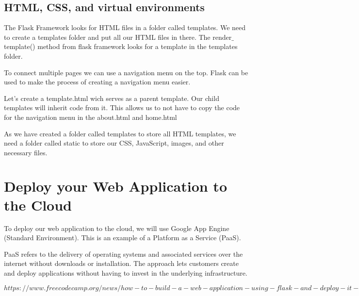 \documentclass{article}
\begin{document}

\subsection{HTML, CSS, and virtual environments}

The Flask Framework looks for HTML files in a folder called templates. We need to create a templates folder and put all our HTML files in there. The render$\_$template() method from flask framework looks for a template in the templates folder.

To connect multiple pages we can use a navigation menu on the top. Flask can be used to make the process of creating a navigation menu easier.

Let's create a template.html wich serves as a parent template. Our child templates will inherit code from it. This allows us to not have to copy the code for the navigation menu in the about.html and home.html

As we have created a folder called templates to store all HTML templates, we need a folder called static to store our CSS, JavaScript, images, and other necessary files. 

\section{Deploy your Web Application to the Cloud}

To deploy our web application to the cloud, we will use Google App Engine (Standard Environment). This is an example of a Platform as a Service (PaaS).

PaaS refers to the delivery of operating systems and associated services over the internet without downloads or installation. The approach lets customers create and deploy applications without having to invest in the underlying infrastructure.


$https://www.freecodecamp.org/news/how-to-build-a-web-application-using-flask-and-deploy-it-to-the-cloud-3551c985e492/$
\end{document}
